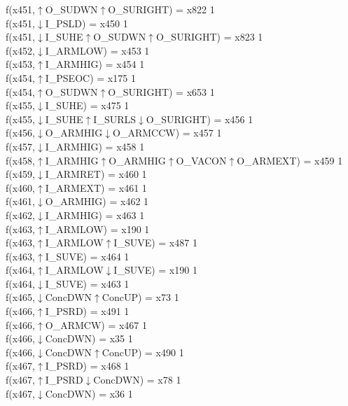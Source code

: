 f(x451,$\uparrow$O\_SUDWN$\uparrow$O\_SURIGHT) = x822 {1} \\
f(x451,$\downarrow$I\_PSLD) = x450 {1} \\
f(x451,$\downarrow$I\_SUHE$\uparrow$O\_SUDWN$\uparrow$O\_SURIGHT) = x823 {1} \\
f(x452,$\downarrow$I\_ARMLOW) = x453 {1} \\
f(x453,$\uparrow$I\_ARMHIG) = x454 {1} \\
f(x454,$\uparrow$I\_PSEOC) = x175 {1} \\
f(x454,$\uparrow$O\_SUDWN$\uparrow$O\_SURIGHT) = x653 {1} \\
f(x455,$\downarrow$I\_SUHE) = x475 {1} \\
f(x455,$\downarrow$I\_SUHE$\uparrow$I\_SURLS$\downarrow$O\_SURIGHT) = x456 {1} \\
f(x456,$\downarrow$O\_ARMHIG$\downarrow$O\_ARMCCW) = x457 {1} \\
f(x457,$\downarrow$I\_ARMHIG) = x458 {1} \\
f(x458,$\uparrow$I\_ARMHIG$\uparrow$O\_ARMHIG$\uparrow$O\_VACON$\uparrow$O\_ARMEXT) = x459 {1} \\
f(x459,$\downarrow$I\_ARMRET) = x460 {1} \\
f(x460,$\uparrow$I\_ARMEXT) = x461 {1} \\
f(x461,$\downarrow$O\_ARMHIG) = x462 {1} \\
f(x462,$\downarrow$I\_ARMHIG) = x463 {1} \\
f(x463,$\uparrow$I\_ARMLOW) = x190 {1} \\
f(x463,$\uparrow$I\_ARMLOW$\uparrow$I\_SUVE) = x487 {1} \\
f(x463,$\uparrow$I\_SUVE) = x464 {1} \\
f(x464,$\uparrow$I\_ARMLOW$\downarrow$I\_SUVE) = x190 {1} \\
f(x464,$\downarrow$I\_SUVE) = x463 {1} \\
f(x465,$\downarrow$ConcDWN$\uparrow$ConcUP) = x73 {1} \\
f(x466,$\uparrow$I\_PSRD) = x491 {1} \\
f(x466,$\uparrow$O\_ARMCW) = x467 {1} \\
f(x466,$\downarrow$ConcDWN) = x35 {1} \\
f(x466,$\downarrow$ConcDWN$\uparrow$ConcUP) = x490 {1} \\
f(x467,$\uparrow$I\_PSRD) = x468 {1} \\
f(x467,$\uparrow$I\_PSRD$\downarrow$ConcDWN) = x78 {1} \\
f(x467,$\downarrow$ConcDWN) = x36 {1} \\
